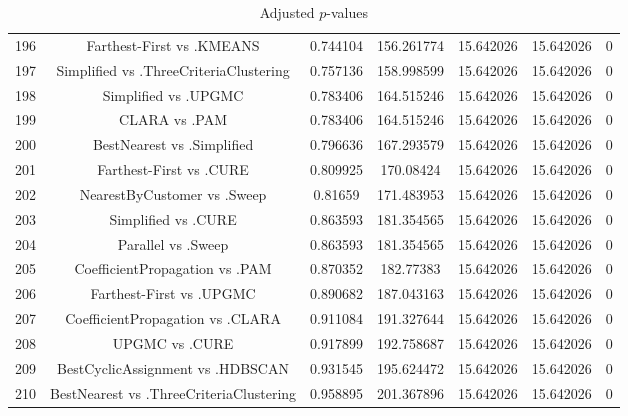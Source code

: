 \documentclass[a4paper,10pt]{article}
\begin{document}
\begin{landscape}
\begin{table}[!htp]
\begin{tabular}{ccccccc}
196&Farthest-First vs .KMEANS&0.744104&156.261774&15.642026&15.642026&0\\
197&Simplified vs .ThreeCriteriaClustering&0.757136&158.998599&15.642026&15.642026&0\\
198&Simplified vs .UPGMC&0.783406&164.515246&15.642026&15.642026&0\\
199&CLARA vs .PAM&0.783406&164.515246&15.642026&15.642026&0\\
200&BestNearest vs .Simplified&0.796636&167.293579&15.642026&15.642026&0\\
201&Farthest-First vs .CURE&0.809925&170.08424&15.642026&15.642026&0\\
202&NearestByCustomer vs .Sweep&0.81659&171.483953&15.642026&15.642026&0\\
203&Simplified vs .CURE&0.863593&181.354565&15.642026&15.642026&0\\
204&Parallel vs .Sweep&0.863593&181.354565&15.642026&15.642026&0\\
205&CoefficientPropagation vs .PAM&0.870352&182.77383&15.642026&15.642026&0\\
206&Farthest-First vs .UPGMC&0.890682&187.043163&15.642026&15.642026&0\\
207&CoefficientPropagation vs .CLARA&0.911084&191.327644&15.642026&15.642026&0\\
208&UPGMC vs .CURE&0.917899&192.758687&15.642026&15.642026&0\\
209&BestCyclicAssignment vs .HDBSCAN&0.931545&195.624472&15.642026&15.642026&0\\
210&BestNearest vs .ThreeCriteriaClustering&0.958895&201.367896&15.642026&15.642026&0\\
\hline
\end{tabular}
\caption{Adjusted $p$-values}
\end{table}

\end{landscape}
\end{document}
